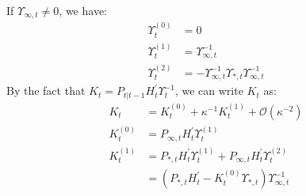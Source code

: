 \documentclass[12pt]{article}
\numberwithin{equation}{section}
\begin{document}
If $\Upsilon_{\infty,t}\neq 0$, we have:
\begin{align*}
    \Upsilon_t^{(0)} &= 0 \\
    \Upsilon_t^{(1)} &= \Upsilon_{\infty,t}^{-1} \\
    \Upsilon_t^{(2)} &= -\Upsilon_{\infty,t}^{-1}\Upsilon_{*,t}\Upsilon_{\infty,t}^{-1}
\end{align*}
By the fact that $K_t = P_{t|t-1}H_t^{'}\Upsilon_t^{-1}$, we can write $K_t$ as:
\begin{align}
    K_t &= K_t^{(0)} + \kappa^{-1}K_t^{(1)} + \mathcal{O}(\kappa^{-2}) \label{eq:K1_diffuse_start} \\
    K_t^{(0)} &= P_{\infty,t}H_t^{'}\Upsilon_t^{(1)} \\
    K_t^{(1)} &= P_{*,t}H_t^{'}\Upsilon_t^{(1)} + P_{\infty,t}H_t^{'}\Upsilon_t^{(2)} \nonumber \\
    &= (P_{*,t}H_t^{'}-K_t^{(0)}\Upsilon_{*,t})\Upsilon_{\infty,t}^{-1} \label{eq:K1_diffuse_end}
\end{align}
\end{document}
